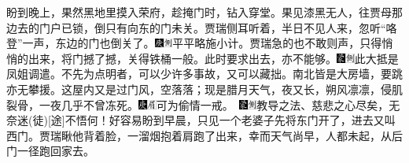 盼到晚上，果然黑地里摸入荣府，趁掩门时，钻入穿堂。果见漆黑无人，往贾母那边去的门户已锁，倒只有向东的门未关。贾瑞侧耳听着，半日不见人来，忽听“咯登”一声，东边的门也倒关了。{\includegraphics[width=3mm]{../Images/00004}\includegraphics[width=3mm]{../Images/00011}\footnotesize \kaishu 平平略施小计。}贾瑞急的也不敢则声，只得悄悄的出来，将门撼了撼，关得铁桶一般。此时要求出去，亦不能够。{\includegraphics[width=3mm]{../Images/00006}\includegraphics[width=3mm]{../Images/00011}\footnotesize \kaishu 此大抵是凤姐调遣。不先为点明者，可以少许多事故，又可以藏拙。}南北皆是大房墙，要跳亦无攀援。这屋内又是过门风，空落落；现是腊月天气，夜又长，朔风凛凛，侵肌裂骨，一夜几乎不曾冻死。{{\includegraphics[width=3mm]{../Images/00004}\includegraphics[width=3mm]{../Images/00010}\footnotesize \kaishu 可为偷情一戒。　}\includegraphics[width=3mm]{../Images/00006}\includegraphics[width=3mm]{../Images/00011}\footnotesize \kaishu 教导之法、慈悲之心尽矣，无奈迷{(徒)}{[}途{]}不悟何！}好容易盼到早晨，只见一个老婆子先将东门开了，进去又叫西门。贾瑞瞅他背着脸，一溜烟抱着肩跑了出来，幸而天气尚早，人都未起，从后门一径跑回家去。

